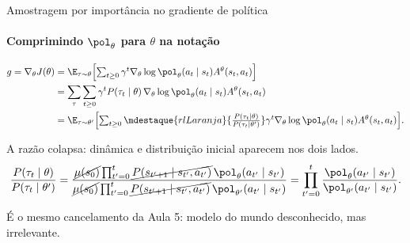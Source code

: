 \documentclass[aspectratio=169, 10pt]{beamer}
\newcommand{\thv}{\theta}
\newcommand{\polth}{\pol_{\thv}}
\newcommand{\gth}{\nabla_{\thv}}
\newcommand{\traj}{\tau}
\newcommand{\Adv}{A}
\begin{document}
\begin{frame}{Amostragem por importância no gradiente de política}
  \framesubtitle{Comprimindo $\polth$ para $\thv$ na notação}

  \begin{align*}
    g = \gth J(\thv)
      &= \E_{\traj\sim\thv}\Bigl[\textstyle\sum_{t\ge0}\gamma^t \gth\log\polth(a_t\mid s_t) \Adv^{\thv}(s_t,a_t)\Bigr]\\
      &= \sum_{\traj}\sum_{t\ge0}\gamma^t P(\traj_t\mid \thv)\,\gth\log\polth(a_t\mid s_t)\Adv^{\thv}(s_t,a_t)\\
      &= \E_{\traj\sim\thv'}\Bigl[\textstyle\sum_{t\ge0}
          \mdestaque{rlLaranja}{\frac{P(\traj_t\mid\thv)}{P(\traj_t\mid\thv')}}
          \gamma^t\gth\log\polth(a_t\mid s_t)\Adv^{\thv}(s_t,a_t)\Bigr].
  \end{align*}

  \pause
  A razão colapsa: dinâmica e distribuição inicial aparecem nos dois lados.
  \[
    \frac{P(\traj_t\mid\thv)}{P(\traj_t\mid\thv')}
      = \frac{\cancel{\mu(s_0)}\prod_{t'=0}^{t}\cancel{P(s_{t'+1}\mid s_{t'},a_{t'})}\,\polth(a_{t'}\mid s_{t'})}
             {\cancel{\mu(s_0)}\prod_{t'=0}^{t}\cancel{P(s_{t'+1}\mid s_{t'},a_{t'})}\,\pol_{\thv'}(a_{t'}\mid s_{t'})}
      = \prod_{t'=0}^{t}\frac{\polth(a_{t'}\mid s_{t'})}{\pol_{\thv'}(a_{t'}\mid s_{t'})}.
  \]

  \begin{ideiabox}
    É o mesmo cancelamento da Aula 5: modelo do mundo desconhecido, mas irrelevante.
  \end{ideiabox}
\end{frame}
\end{document}
